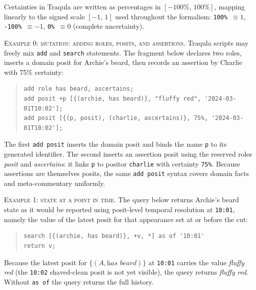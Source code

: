 \documentclass[a4paper,fleqn]{cas-sc}
\begin{document}
Certainties in Traqula are written as percentages in \([-100\%,\,100\%]\), mapping linearly to the signed scale \([-1,\,1]\) used throughout the formalism: \texttt{100\%}~\(\equiv 1\), \texttt{-100\%}~\(\equiv -1\), \texttt{0\%}~\(\equiv 0\) (complete uncertainty).

\textsc{Example 0: mutation: adding roles, posits, and assertions.} Traqula scripts may freely mix \texttt{add} and \texttt{search} statements. The fragment below declares two roles, inserts a domain posit for Archie's beard, then records an assertion by Charlie with 75\% certainty:
\begin{quote}
\small
\begin{verbatim}
add role has beard, ascertains;
add posit +p [{(archie, has beard)}, "fluffy red", '2024-03-01T10:02'];
add posit [{(p, posit), (charlie, ascertains)}, 75%, '2024-03-01T10:02'];
\end{verbatim}
\end{quote}
The first \texttt{add posit} inserts the domain posit and binds the name \texttt{p} to its generated identifier. The second inserts an assertion posit using the reserved roles \textit{posit} and \textit{ascertains}: it links \texttt{p} to positor \texttt{charlie} with certainty \texttt{75\%}. Because assertions are themselves posits, the same \texttt{add posit} syntax covers domain facts and meta-commentary uniformly.

\textsc{Example 1: state at a point in time.} The query below returns Archie's beard state as it would be reported using posit-level temporal resolution at \texttt{10:01}, namely the value of the latest posit for that appearance set at or before the cut:
\begin{quote}
\small
\begin{verbatim}
search [{(archie, has beard)}, +v, *] as of '10:01'
return v;
\end{verbatim}
\end{quote}
Because the latest posit for \(\{(A,\textit{has beard})\}\) at \texttt{10:01} carries the value \textit{fluffy red} (the \texttt{10:02} shaved-clean posit is not yet visible), the query returns \textit{fluffy red}. Without \texttt{as of} the query returns the full history.
\end{document}
